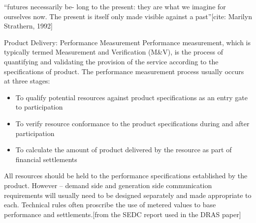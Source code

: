 ``futures necessarily be- long to the present: they are what we imagine for ourselves now. The present is itself only made visible against a past''[cite: Marilyn Strathern, 1992]

Product Delivery: Performance Measurement 
Performance measurement, which is typically termed Measurement and Verification (M\&V), is the process of quantifying and validating the provision of the service according to the specifications of product. The performance measurement process usually occurs at three stages: 
\begin{itemize}
	\item To qualify potential resources against product specifications as an entry gate to participation 
	\item To verify resource conformance to the product specifications during and after participation 
	\item To calculate the amount of product delivered by the resource as part of financial settlements
\end{itemize}
 
All resources should be held to the performance specifications established by the product. However – demand side and generation side communication requirements will usually need to be designed separately and made appropriate to each. Technical rules often proscribe the use of metered values to base performance and settlements.[from the SEDC report used in the DRAS paper]



